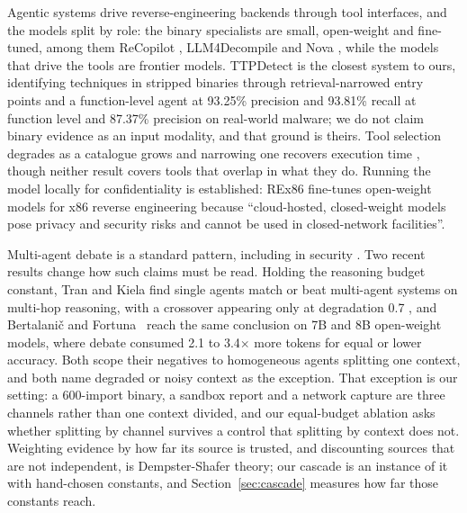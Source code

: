 Agentic systems drive reverse-engineering backends through tool interfaces, and the models split by
role: the binary specialists are small, open-weight and fine-tuned, among them ReCopilot
, LLM4Decompile \citep{tan2024llm4decompile} and Nova
\citep{jiang2025nova}, while the models that drive the tools are frontier models. TTPDetect
 is the closest system to ours, identifying techniques in stripped
binaries through retrieval-narrowed entry points and a function-level agent at 93.25\% precision and
93.81\% recall at function level and 87.37\% precision on real-world malware; we do not claim binary
evidence as an input modality, and that ground is theirs. Tool selection degrades as a catalogue
grows  and narrowing one recovers execution time
\citep{paramanayakam2025lessismore}, though neither result covers tools that overlap in what they
do. Running the model locally for confidentiality is established: REx86 \citep{lea2025rex86}
fine-tunes open-weight models for x86 reverse engineering because ``cloud-hosted, closed-weight
models pose privacy and security risks and cannot be used in closed-network facilities''.

Multi-agent debate is a standard pattern, including in security \citep{li2025phishdebate}. Two
recent results change how such claims must be read. Holding the reasoning budget constant, Tran and
Kiela find single agents match or beat multi-agent systems on multi-hop reasoning, with a crossover
appearing only at degradation 0.7 , and
Bertalani\v{c} and Fortuna~\cite{bertalanic2026consensus} reach the same conclusion on 7B and 8B open-weight models, where
debate consumed 2.1 to 3.4$\times$ more tokens for equal or lower accuracy. Both scope their
negatives to homogeneous agents splitting one context, and both name degraded or noisy context as
the exception. That exception is our setting: a 600-import binary, a sandbox report and a network
capture are three channels rather than one context divided, and our equal-budget ablation asks
whether splitting by channel survives a control that splitting by context does not. Weighting
evidence by how far its source is trusted, and discounting sources that are not independent, is
Dempster-Shafer theory; our cascade is an instance of it with hand-chosen constants, and
Section~\ref{sec:cascade} measures how far those constants reach.

